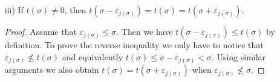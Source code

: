 \documentclass[12pt]{amsart}
\theoremstyle{definition}
\theoremstyle{remark}
\numberwithin{equation}{section}
\begin{document}
\begin{itemize}
  \vskip 2mm

 \item[iii)] If $t(\sigma) \neq 0$, then
 $t(\sigma  - \varepsilon_{j(\sigma)}) = t(\sigma)= t(\sigma  + \varepsilon_{j(\sigma)})$.

   \vskip 2mm


 \begin{proof}
Assume that $ \varepsilon_{j(\sigma)} \leq \sigma$. Then we have $t(\sigma  - \varepsilon_{j(\sigma)}) \leq t(\sigma)$
by definition. To prove the reverse inequality we only have to notice that  $ \varepsilon_{j(\sigma)} \not\leq t(\sigma)$ and
equivalently $ t(\sigma) \leq \sigma - \varepsilon_{j(\sigma)} < \sigma$. Using similar arguments we also obtain
$t(\sigma)= t(\sigma  + \varepsilon_{j(\sigma)})$ when $ \varepsilon_{j(\sigma)} \not\leq \sigma$.
 \end{proof}


\end{itemize}
\end{document}
